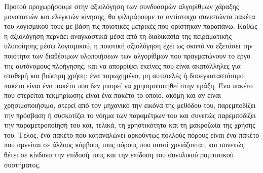Προτού προχωρήσουμε στην αξιολόγηση των συνδυασμών αλγορίθμων χάραξης
μονοπατιών και ελεγκτών κίνησης, θα φιλτράρουμε τα αντίστοιχα συνιστώντα πακέτα
του λογισμικού τους με βάση τις ποιοτικές μετρικές που ορίστηκαν παραπάνω.
Καθώς η αξιολόγηση περνάει αναγκαστικά μέσα από τη διαδικασία της πειραματικής
υλοποίησης μέσω λογισμικού, η ποιοτική αξιολόγηση έχει ως σκοπό να εξετάσει την
ποιότητα των διαθέσιμων υλοποιήσεων των αλγορίθμων που πραγματώνουν το έργο της
αυτόνομους πλοήγησης, και να απορρίψει εκείνες που είναι ακατάλληλες για
σταθερή και βιώσιμη χρήση: ένα παρωχημένο, μη αυτοτελές ή δυσεγκαταστάσιμο
πακέτο είναι ένα πακέτο που δεν μπορεί να χρησιμοποιηθεί στην πράξη. Ένα πακέτο
που στερείται τεκμηρίωσης είναι ένα πακέτο το οποίο, ακόμη και αν είναι
χρησιμοποιήσιμο, στερεί από τον μηχανικό την εικόνα της μεθόδου του,
παρεμποδίζει την πρόσβαση ή συσκοτίζει το νόημα των παραμέτρων του και συνεπώς
παρεμποδίζει την παραμετροποίησή του και, τελικά, τη χρηστικότητα και τη
μακροζωία της χρήσης του. Τέλος, ένα πακέτο που καταναλώνει αρκούντως πολλούς
πόρους είναι ένα πακέτο που αρνείται σε άλλους κόμβους τους πόρους που αυτοί
χρειάζονται, και συνεπώς θέτει σε κίνδυνο την επίδοσή τους και την επίδοση του
συνολικού ρομποτικού συστήματος.
